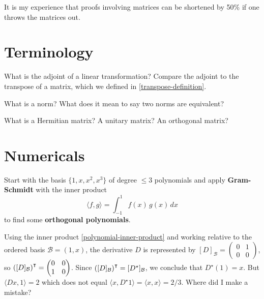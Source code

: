 \documentclass{homework}
\author{Jim Fowler}
\begin{document}
\maketitle

\begin{inspiration}
It is my experience that proofs involving matrices can be shortened by 50\% if one throws the matrices out.
\end{inspiration}

\section{Terminology}

\begin{problem}\label{definition-adjoint}What is the adjoint of a linear transformation?  Compare the adjoint
  to the transpose of a matrix, which we defined in
  \ref{transpose-definition}.
\end{problem}

\begin{problem}
  What is a norm?  What does it mean to say two norms are equivalent?
\end{problem}

\begin{problem}
  What is a Hermitian matrix?  A unitary matrix?  An orthogonal matrix?
\end{problem}

\section{Numericals}

\begin{problem}\label{legendre-inner-product}Start with the basis $\{1,x,x^2,x^3\}$ of degree $\leq 3$
  polynomials and apply \textbf{Gram-Schmidt} with the inner product
  \begin{equation}\label{polynomial-inner-product}\tag{$*$}
    \langle f,g \rangle = \int_{-1}^1 f(x) \, g(x) \, dx
  \end{equation}
  to find some \textbf{orthogonal polynomials}.  
\end{problem}

\begin{problem}
  Using the inner product \eqref{polynomial-inner-product} and working relative to the ordered basis $\mathcal{B} = (1,x)$, the derivative $D$ is represented by  $[D]_{\mathcal{B}} = \begin{pmatrix} 0 & 1 \\ 0 & 0 \end{pmatrix}$, so $\left( [D]_{\mathcal{B}}\right)^\intercal = \begin{pmatrix} 0 & 0 \\ 1 & 0 \end{pmatrix}$.  Since $\left( [D]_{\mathcal{B}}\right)^\intercal = [D^\star]_{\mathcal{B}}$, we conclude that $D^\star(1) = x$.  But $\langle D x, 1 \rangle = 2$ which does not equal $\langle x, D^\star 1 \rangle = \langle x, x \rangle = 2/3$. 
  Where did I make a mistake?
\end{problem}
\end{document}
